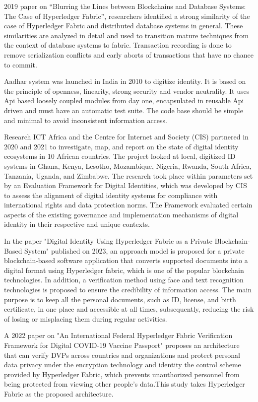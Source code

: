  2019 paper on “Blurring the Lines between Blockchains and Database Systems: The Case of Hyperledger Fabric”, researchers identified a strong similarity of the case of Hyperledger Fabric and distributed database systems in general. These similarities are analyzed in detail and used to transition mature techniques from the context of database systems to fabric. Transaction recording is done to remove serialization conflicts and early aborts of transactions that have no chance to commit\cite{sharma2019blurring}. 

Aadhar system was launched in India in 2010 to digitize identity. It is based on the principle of openness, linearity, strong security and vendor neutrality. It uses Api based loosely coupled modules from day one, encapsulated in reusable Api driven and must have an automatic test suite. The code base should be simple and minimal to avoid inconsistent information access\cite{dalwai2014aadhaar}.

 Research ICT Africa and the Centre for Internet and Society (CIS) partnered in 2020 and 2021 to investigate, map, and report on the state of digital identity ecosystems in 10 African countries. The project looked at local, digitized ID systems in Ghana, Kenya, Lesotho, Mozambique, Nigeria, Rwanda, South Africa, Tanzania, Uganda, and Zimbabwe\cite{ngwenya2021digital}. The research took place within parameters set by an Evaluation Framework for Digital Identities, which was developed by CIS to assess the alignment of digital identity systems for compliance with international rights and data protection norms. The Framework evaluated certain aspects of the existing governance and implementation mechanisms of digital identity in their respective and unique contexts.
 
 In the paper "Digital Identity Using Hyperledger Fabric as a Private Blockchain-Based System" published on 2023, an approach model is proposed for a private blockchain-based software application that converts supported documents into a digital format using Hyperledger fabric, which is one of the popular blockchain technologies. In addition, a verification method using face and text recognition technologies is proposed to ensure the credibility of information access. The main purpose is to keep all the personal documents, such as ID, license, and birth certificate, in one place and accessible at all times, subsequently, reducing the risk of losing or misplacing them during regular activities\cite{odeh2023digital}.

 A 2022 paper on "An International Federal Hyperledger Fabric Verification Framework for Digital COVID-19 Vaccine Passport" proposes an architecture that can verify DVPs across countries and organizations and protect personal data privacy under the encryption technology and identity the control scheme provided by Hyperledger Fabric, which prevents unauthorized personnel from being protected from viewing other people’s data.This study takes Hyperledger Fabric as the proposed architecture\cite{shih2022international}.

